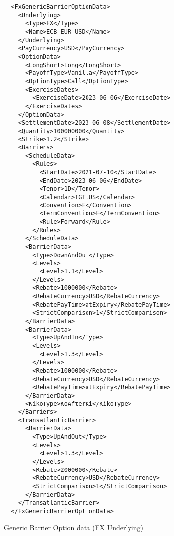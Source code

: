 \begin{listing}[H]
\begin{verbatim}
  <FxGenericBarrierOptionData>
    <Underlying>
      <Type>FX</Type>
      <Name>ECB-EUR-USD</Name>
    </Underlying>
    <PayCurrency>USD</PayCurrency>
    <OptionData>
      <LongShort>Long</LongShort>
      <PayoffType>Vanilla</PayoffType>
      <OptionType>Call</OptionType>
      <ExerciseDates>
        <ExerciseDate>2023-06-06</ExerciseDate>
      </ExerciseDates>
    </OptionData>
    <SettlementDate>2023-06-08</SettlementDate>
    <Quantity>100000000</Quantity>
    <Strike>1.2</Strike>
    <Barriers>
      <ScheduleData>
        <Rules>
          <StartDate>2021-07-10</StartDate>
          <EndDate>2023-06-06</EndDate>
          <Tenor>1D</Tenor>
          <Calendar>TGT,US</Calendar>
          <Convention>F</Convention>
          <TermConvention>F</TermConvention>
          <Rule>Forward</Rule>
        </Rules>
      </ScheduleData>
      <BarrierData>
        <Type>DownAndOut</Type>
        <Levels>
          <Level>1.1</Level>
        </Levels>
        <Rebate>1000000</Rebate>
        <RebateCurrency>USD</RebateCurrency>
        <RebatePayTime>atExpiry</RebatePayTime>
        <StrictComparison>1</StrictComparison>
      </BarrierData>
      <BarrierData>
        <Type>UpAndIn</Type>
        <Levels>
          <Level>1.3</Level>
        </Levels>
        <Rebate>1000000</Rebate>
        <RebateCurrency>USD</RebateCurrency>
        <RebatePayTime>atExpiry</RebatePayTime>
      </BarrierData>
      <KikoType>KoAfterKi</KikoType>
    </Barriers>
    <TransatlanticBarrier>
      <BarrierData>
        <Type>UpAndOut</Type>
        <Levels>
          <Level>1.3</Level>
        </Levels>
        <Rebate>2000000</Rebate>
        <RebateCurrency>USD</RebateCurrency>
        <StrictComparison>1</StrictComparison>
      </BarrierData>
    </TransatlanticBarrier>
  </FxGenericBarrierOptionData>
\end{verbatim}
\caption{Generic Barrier Option data (FX Underlying)}
\label{lst:generic_barrieroption_data}
\end{listing}

